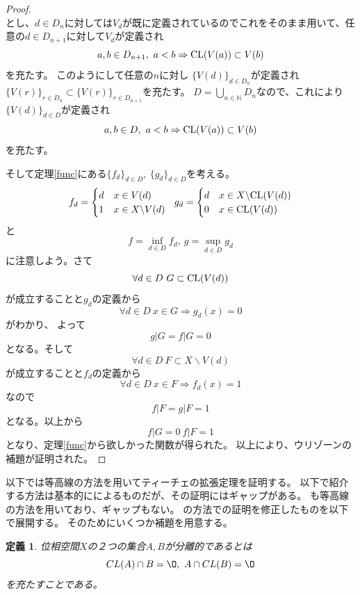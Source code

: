 \documentclass[leqno]{jsarticle}
\newtheorem{df}[thm]{定義}
\newcommand{\cl}{\text{{\rm CL}} }
\begin{document}
\begin{proof}
\[\]とし、$d\in D_n$に対しては$V_d$が既に定義されているのでこれをそのまま用いて、任意の$d\in D_{n+1}$に対して$V_d$が定義され
\[
a,b\in D_{n+1},\ a<b\Rightarrow \cl(V(a))\subset V(b)
\]を充たす。
このようにして任意の$n$に対し
$\{V(d)\}_{d\in D_{n}}$が定義され$\{V(r)\}_{r\in D_{n}}\subset \{V(r)\}_{r\in D_{n+1}}$を充たす。
$D=\bigcup_{n\in \mathbb{N}}D_{n}$なので、これにより$\{V(d)\}_{d\in D}$が定義され
\[
a,b\in D,\ a<b\Rightarrow \cl(V(a))\subset V(b)
\]を充たす。\par
そして定理\ref{func}にある$\{f_d\}_{d\in D},\ \{g_d\}_{d\in D}$を考える。
\[
f_d=\begin{cases}
 d & \text{$x\in V(d)$} \\
 1 & \text{$x\in X\backslash V(d)$}
\end{cases}\ \ 
g_d=\begin{cases}
 d & \text{$x\in X\backslash \cl(V(d))$} \\
 0 & \text{$x\in \cl(V(d))$}
\end{cases}
\]
と
\[
f=\inf_{d\in D}f_d,\ 
g=\sup_{d\in D}g_d
\]
に注意しよう。さて
\[
\forall d\in D\ G\subset \cl(V(d))
\]
が成立することと$g_d$の定義から
\[
\forall d\in D\ x\in G\Rightarrow g_d(x)=0
\]
がわかり、
よって
\[
g|G=f|G=0
\]
となる。そして
\[
\forall d\in D\ F\subset X\backslash V(d)
\]
が成立することと$f_d$の定義から
\[
\forall d\in D\ x\in F\Rightarrow f_d(x)=1
\]
なので
\[
f|F=g|F=1
\]
となる。以上から
\[
f|G=0\ f|F=1
\]となり、定理\ref{func}から欲しかった関数が得られた。
以上により、ウリゾーンの補題が証明された。
\end{proof}
以下では等高線の方法を用いてティーチェの拡張定理を証明する。
以下で紹介する方法は基本的に\cite{o}によるものだが、その証明にはギャップがある。
\cite{B}も等高線の方法を用いており、ギャップもない。
\cite{B}の方法で\cite{o}の証明を修正したものを以下で展開する。
そのためにいくつか補題を用意する。
\begin{df}
位相空間$X$の２つの集合$A,B$が分離的であるとは
\[
CL(A)\cap B=\O,\ A\cap CL(B)=\O
\]
を充たすことである。
\end{df}
\end{document}
